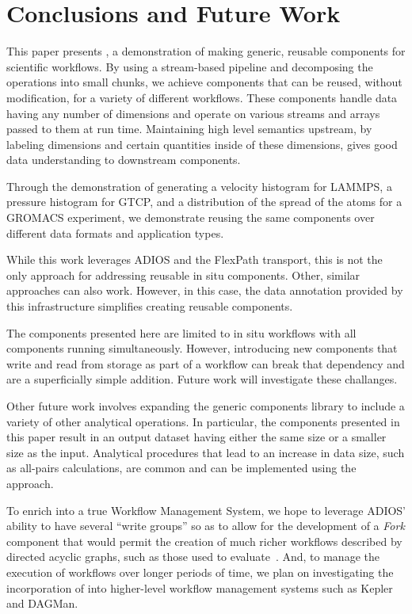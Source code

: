 \section{Conclusions and Future Work}
\label{s:conclusion}

This paper presents \sys, a demonstration of making generic, reusable
components for scientific workflows. By using a stream-based pipeline and decomposing the operations into small
chunks, we achieve components that can be reused, without modification, for
a variety of different workflows. 
These components 
handle data having any number of dimensions
and operate on various streams and arrays
passed to them at run time.
Maintaining high level semantics upstream, by
labeling dimensions and certain quantities inside of these dimensions, gives
good data understanding to downstream components.

Through the demonstration of generating a velocity histogram for LAMMPS,
a pressure histogram for GTCP,
and a distribution of the spread of the atoms for a GROMACS
experiment,
we demonstrate reusing the same components
over different data formats and application types.

While this work leverages ADIOS and the FlexPath transport, this is not the
only approach for addressing reusable in situ components. Other, similar
approaches can also work. However, in this case,
the data annotation provided by this
infrastructure simplifies creating reusable components.

The components presented here are limited to in situ workflows with all
components running simultaneously. However, introducing new components that write
and read from storage as part of a workflow can break that dependency and are a
superficially simple addition. Future work will investigate these challanges.

Other future work involves
expanding the generic components library 
to include a variety of other analytical operations.
In particular, the \sys components presented
in this paper
result in an output dataset having either the same
size or a smaller size as the input.
Analytical procedures that lead
to an increase in data size, such as
all-pairs calculations, are common and
can be implemented using the \sys approach.

To enrich \sys into a true Workflow Management
System, we hope to leverage
ADIOS' ability to have several ``write groups''
so as to allow for the development
of a {\em Fork} component
that would permit
the creation of much richer workflows
described by directed acyclic graphs,
such as those used to evaluate~\cite{sim2015analyzethis}.
And, to manage the execution of workflows
over longer periods of time,
we plan on investigating
the incorporation of \sys into
higher-level workflow management systems
such as Kepler and DAGMan.

